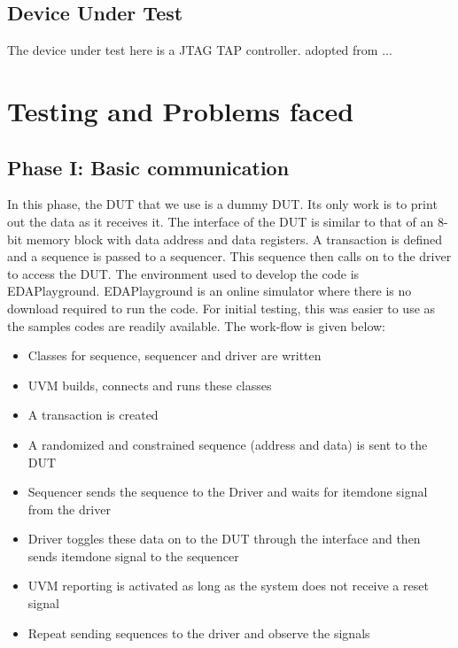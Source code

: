 \documentclass[a4paper,11pt]{article}
\begin{document}
\subsection{Device Under Test}
The device under test here is a JTAG TAP controller. adopted from ...


\newpage
\pagebreak

\section{Testing and Problems faced}
\subsection{Phase I: Basic communication}
In this phase, the DUT that we use is a dummy DUT. Its only work is to print out the data as it receives it. The interface of the DUT is similar to that of an 8-bit memory block with data address and data registers. A transaction is defined and a sequence is passed to a sequencer. This sequence then calls on to the driver to access the DUT. The environment used to develop the code is EDAPlayground. EDAPlayground is an online simulator where there is no download required to run the code. For initial testing, this was easier to use as the samples codes are readily available.  
The work-flow is given below:

\begin{itemize}[noitemsep]
\item Classes for sequence, sequencer and driver are written
\item UVM builds, connects and runs these classes
\item A transaction is created
\item A randomized and constrained sequence (address and data) is sent to the DUT
\item Sequencer sends the sequence to the Driver and waits for item\textunderscore done signal from the driver
\item Driver toggles these data on to the DUT through the interface and then sends item\textunderscore done signal to the sequencer
\item UVM reporting is activated as long as the system does not receive a reset signal
\item Repeat sending sequences to the driver and observe the signals
\end{itemize}
\end{document}
